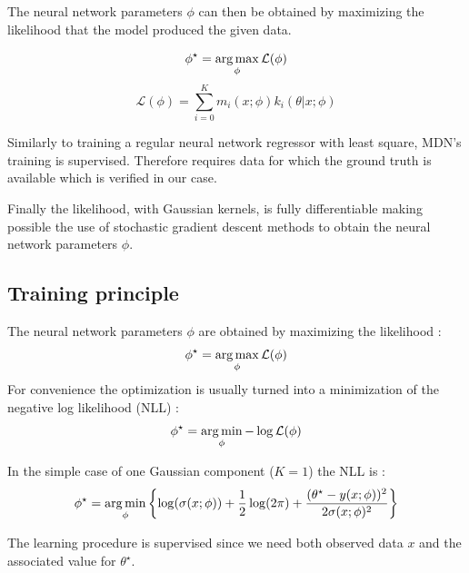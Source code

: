 The neural network parameters $\phi$ can then be obtained by maximizing the likelihood that the model produced the given data.

\begin{equation}
    \phi^\star = \operatorname*{arg\,max}_\phi \mathcal L (\phi)
\end{equation}
\begin{equation}
    \mathcal L (\phi) = \sum_{i=0}^K m_i(x ; \phi) k_i(\theta | x ; \phi)
\end{equation}

Similarly to training a regular neural network regressor with least square, MDN's training is supervised.
Therefore requires data for which the ground truth is available which is verified in our case.

Finally the likelihood, with Gaussian kernels, is fully differentiable making possible the use of stochastic gradient descent methods to obtain the neural network parameters $\phi$.



\subsection{Training principle} %
\label{sub:training_principle}


The neural network parameters $\phi$ are obtained by maximizing the likelihood :
\begin{equation}
    \phi^\star = \operatorname*{arg\,max}_\phi \mathcal L (\phi)
\end{equation}
For convenience the optimization is usually turned into a minimization of the negative log likelihood (NLL) :
\begin{equation}
    \phi^\star = \operatorname*{arg\,min}_\phi - \log \mathcal L (\phi)
\end{equation}

In the simple case of one Gaussian component ($K=1$) the NLL is :
\begin{equation}
    \phi^\star = \operatorname*{arg\,min}_\phi \left\{ \log(\sigma(x;\phi)) + \frac{1}{2}\log(2\pi) + \frac{(\theta^\star - y(x;\phi))^2}{2\sigma(x;\phi)^2} \right\}
\end{equation}

The learning procedure is supervised since we need both observed data $x$ and the associated value for  $\theta^\star$.

